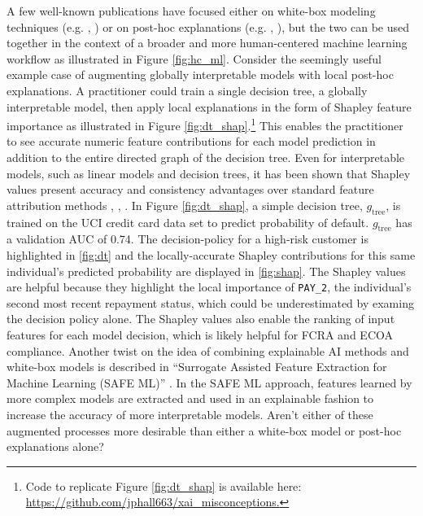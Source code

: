 \documentclass[fleqn]{article}
\begin{document}
A few well-known publications have focused either on white-box modeling techniques (e.g. \cite{slim}, \cite{sbrl}) or on post-hoc explanations (e.g.  \cite{shapley}, \cite{lime}), but the two can be used together in the context of a broader and more human-centered machine learning workflow as illustrated in Figure \ref{fig:hc_ml}. Consider the seemingly useful example case of augmenting globally interpretable models with local post-hoc explanations. A practitioner could train a single decision tree, a globally interpretable model, then apply local explanations in the form of Shapley feature importance as illustrated in Figure \ref{fig:dt_shap}.\footnote{Code to replicate Figure \ref{fig:dt_shap} is available here: \url{https://github.com/jphall663/xai_misconceptions.}} This enables the practitioner to see accurate numeric feature contributions for each model prediction in addition to the entire directed graph of the decision tree. Even for interpretable models, such as linear models and decision trees, it has been shown that Shapley values present accuracy and consistency advantages over standard feature attribution methods \cite{lipovetsky2001analysis}, \cite{tree_shap}, \cite{shapley}. In Figure \ref{fig:dt_shap}, a simple decision tree, $g_{\text{tree}}$, is trained on the UCI credit card data set to predict probability of default. $g_{\text{tree}}$ has a validation AUC of 0.74. The decision-policy for a high-risk customer is highlighted in \ref{fig:dt} and the locally-accurate Shapley contributions for this same individual's predicted probability are displayed in \ref{fig:shap}. The Shapley values are helpful because they highlight the local importance of \texttt{PAY\_2}, the individual's second most recent repayment status, which could be underestimated by examing the decision policy alone. The Shapley values also enable the ranking of input features for each model decision, which is likely helpful for FCRA and ECOA compliance. Another twist on the idea of combining explainable AI methods and white-box models is described in ``Surrogate Assisted Feature Extraction for Machine Learning (SAFE ML)'' \cite{gosiewska2019safe}. In the SAFE ML approach, features learned by more complex models are extracted and used in an explainable fashion to increase the accuracy of more interpretable models. Aren't either of these augmented processes more desirable than either a white-box model or post-hoc explanations alone?\\ 
\end{document}
